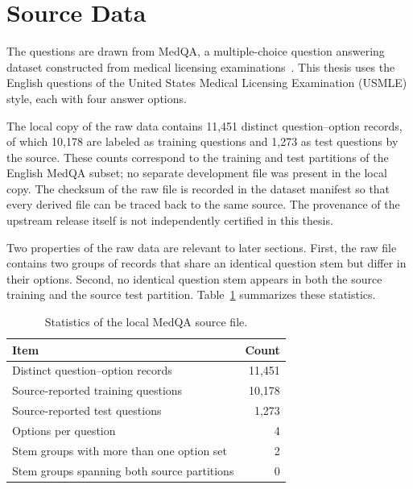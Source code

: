 \section{Source Data}
\label{sec:data_source}

The questions are drawn from MedQA, a multiple-choice question answering dataset constructed from medical licensing examinations~\cite{jin_medqa_2021}. This thesis uses the English questions of the United States Medical Licensing Examination (USMLE) style, each with four answer options.

The local copy of the raw data contains 11,451 distinct question--option records, of which 10,178 are labeled as training questions and 1,273 as test questions by the source. These counts correspond to the training and test partitions of the English MedQA subset; no separate development file was present in the local copy. The checksum of the raw file is recorded in the dataset manifest so that every derived file can be traced back to the same source. The provenance of the upstream release itself is not independently certified in this thesis.

Two properties of the raw data are relevant to later sections. First, the raw file contains two groups of records that share an identical question stem but differ in their options. Second, no identical question stem appears in both the source training and the source test partition. Table~\ref{tab:raw_stats} summarizes these statistics.

\begin{table}[H]
\centering
\caption{Statistics of the local MedQA source file.}
\label{tab:raw_stats}
\begin{tabular}{lr}
\toprule
Item & Count \\
\midrule
Distinct question--option records & 11,451 \\
\quad Source-reported training questions & 10,178 \\
\quad Source-reported test questions & 1,273 \\
Options per question & 4 \\
Stem groups with more than one option set & 2 \\
Stem groups spanning both source partitions & 0 \\
\bottomrule
\end{tabular}
\end{table}

